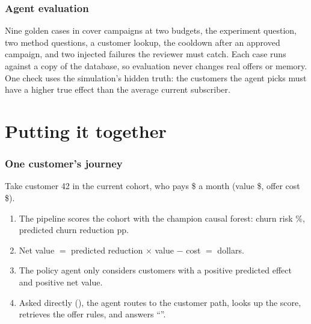 \documentclass[11pt]{article}
\begin{document}
\section{Agent evaluation}
\label{sec:eval}
Nine golden cases in  cover campaigns at two budgets, the experiment question, two method questions, a customer lookup, the cooldown after an approved campaign, and two injected failures the reviewer must catch. Each case runs against a copy of the database, so evaluation never changes real offers or memory.
One check uses the simulation's hidden truth: the customers the agent picks must have a higher true effect than the average current subscriber.

\part{Putting it together}

\section{One customer's journey}
Take customer 42 in the current cohort, who pays \$\RexFee{} a month (value \$\RexValue, offer cost \$\RexCost).
\begin{enumerate}
\item The pipeline scores the cohort with the champion causal forest: churn risk \RexRisk\%, predicted churn reduction \RexTau{} pp.
\item Net value $=$ predicted reduction $\times$ value $-$ cost $=$ \RexNet{} dollars.
\item The policy agent only considers customers with a positive predicted effect and positive net value.
\item Asked directly (), the agent routes to the customer path, looks up the score, retrieves the offer rules, and answers ``\RexDecision''.
\end{enumerate}
\end{document}
